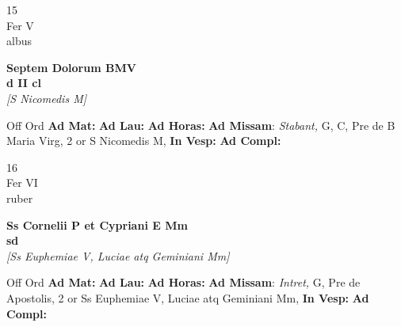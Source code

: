 \documentclass[10pt, openany]{book}
\begin{document}
        \begin{center}
            \begin{minipage}{3.5in}
                \vspace{2em}
                \begin{minipage}{0.5in}
                    {\Huge 15} \\
                    {\normalsize Fer V} \\
                    {\normalsize albus}
                \end{minipage}
                \begin{minipage}{3.0in}
                    \textbf{ \large Septem Dolorum BMV \\
                    \textnormal{\normalsize d II cl}} \\ \textit{[S Nicomedis M]} \\ 
                \end{minipage}
                \begin{justify}Off Ord
                    \textbf{Ad Mat: }
                    \textbf{Ad Lau: }
                    \textbf{Ad Horas: }\textbf{Ad Missam}: \textit{Stabant,} G, C, Pre de B Maria Virg, 2 or S Nicomedis M,  
                    \textbf{In Vesp: }
                    \textbf{Ad Compl: }
                \end{justify}
            \end{minipage}
        \end{center}
    
        \begin{center}
            \begin{minipage}{3.5in}
                \vspace{2em}
                \begin{minipage}{0.5in}
                    {\Huge 16} \\
                    {\normalsize Fer VI} \\
                    {\normalsize ruber}
                \end{minipage}
                \begin{minipage}{3.0in}
                    \textbf{ \large Ss Cornelii P et Cypriani E Mm \\
                    \textnormal{\normalsize sd}} \\ \textit{[Ss Euphemiae V, Luciae atq Geminiani Mm]} \\ 
                \end{minipage}
                \begin{justify}Off Ord
                    \textbf{Ad Mat: }
                    \textbf{Ad Lau: }
                    \textbf{Ad Horas: }\textbf{Ad Missam}: \textit{Intret,} G, Pre de Apostolis, 2 or Ss Euphemiae V, Luciae atq Geminiani Mm,  
                    \textbf{In Vesp: }
                    \textbf{Ad Compl: }
                \end{justify}
            \end{minipage}
        \end{center}
    
\end{document}
